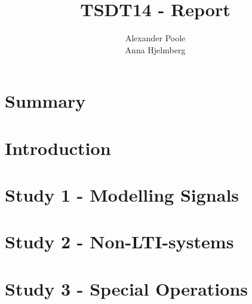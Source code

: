 \documentclass[a4paper,12pt]{article}
\title{TSDT14 - Report}
\author{Alexander Poole \\ Anna Hjelmberg}
\begin{document}
\maketitle
\newpage

\section{Summary}

\newpage
\tableofcontents
\newpage



\section{Introduction}

\section{Study 1 - Modelling Signals}

\section{Study 2 - Non-LTI-systems}

\section{Study 3 - Special Operations}
\end{document}
